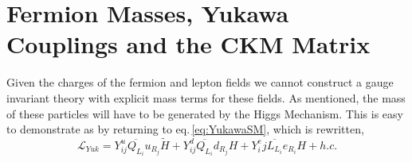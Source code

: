 \section{Fermion Masses, Yukawa Couplings and the CKM Matrix}

Given the charges of the fermion and lepton fields we cannot construct a gauge invariant theory with explicit mass terms for these fields. As mentioned, the mass of these particles will have to be generated by the Higgs Mechanism. This is easy to demonstrate as by returning to eq.\,\ref{eq:YukawaSM}, which is rewritten, 
\begin{equation}
\label{eq:YukawaSM2}
\mathcal{L}_{Yuk} = Y^u_{ij} \overline{Q_{L_i}} u_{R_j}  \tilde{H} + Y^d_{ij} \overline{Q_{L_i}}  d_{R_j} H  + Y^e_ij \overline{L_{L_i}}  e_{R_i} H + h.c. 
\end{equation}
%
